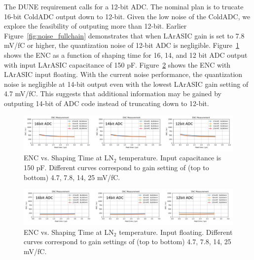 The DUNE requirement calls for a 12-bit ADC. The nominal plan is to trucate 16-bit ColdADC output down to 
12-bit. Given the low noise of the ColdADC, we explore the feasibility of outputing more than 12-bit.
Earlier Figure~\ref{fig:noise_fullchain} demonstrates that when LArASIC gain is set to 7.8 mV/fC or higher, 
the quantization noise of 12-bit ADC is negligible. Figure~\ref{fig:noise_quant150pf} 
shows the ENC as a function of shaping time for 16, 14, and 12 bit ADC output with input LArASIC capacitance
of 150 pF. Figure~\ref{fig:noise_quantfloat} shows the ENC with LArASIC input floating. With the 
current noise performance, the quantization noise is negligible at 14-bit output even with the lowest LArASIC gain setting of 4.7 mV/fC.
This suggests that additional information may be gained by outputing 14-bit of ADC code instead of truncating down to 12-bit.
\begin{figure}[h!]
\centering
  \includegraphics[width=1.0\linewidth]{figures/noise_quant150pf.png}
  \caption{ENC vs. Shaping Time at LN$_2$ temperature. Input capacitance is 150 pF. Different curves 
correspond to gain setting of (top to bottom) 4.7, 7.8, 14, 25 mV/fC.}
  \label{fig:noise_quant150pf}
\end{figure}
\begin{figure}[h!]
\centering
  \includegraphics[width=1.0\linewidth]{figures/noise_quantfloat.png}
  \caption{ENC vs. Shaping Time at LN$_2$ temperature. Input floating. Different curves correspond to 
gain settings of (top to bottom) 4.7, 7.8, 14, 25 mV/fC.}
  \label{fig:noise_quantfloat}
\end{figure}



